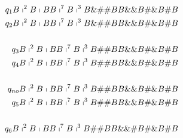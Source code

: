 \begin{frame}
  \begin{eqnarray*}
    && q_{1} B \shortmid^{2} B \shortmid BB \shortmid^{7} B \shortmid^{3} B \&\#\# BB \&\& B \#\& B \# B \\
    && q_{2} B \shortmid^{2} B \shortmid BB \shortmid^{7} B \shortmid^{3} B \&\#\# BB \&\& B \#\& B \# B \\
    && \\
    && q_{3} B \shortmid^{2} B \shortmid BB \shortmid^{7} B \shortmid^{3} B \#\# BB \&\& B \#\& B \# B \\
    && q_{4} B \shortmid^{2} B \shortmid BB \shortmid^{7} B \shortmid^{3} B \#\# BB \&\& B \#\& B \# B \\
    && \\
    && q_{no} B \shortmid^{2} B \shortmid BB \shortmid^{7} B \shortmid^{3} B \#\# BB \&\& B \#\& B \# B \\
    && q_{5} B \shortmid^{2} B \shortmid BB \shortmid^{7} B \shortmid^{3} B \#\# BB \&\& B \#\& B \# B \\
    && \\
    && q_{6} B \shortmid^{2} B \shortmid BB \shortmid^{7} B \shortmid^{3} B \#\# BB \&\&\# B \#\& B \# B
  \end{eqnarray*}
\end{frame}

